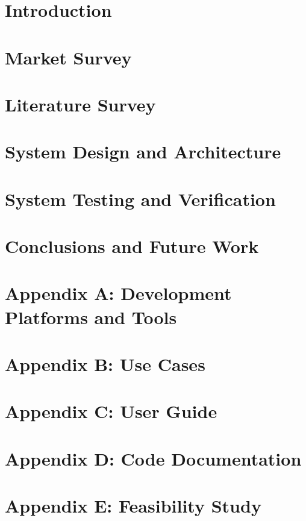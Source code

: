 \documentclass[a4paper,12pt]{report}
\begin{document}
\thispagestyle{empty}

\tableofcontents
\listoffigures
\listoftables
\clearpage


\part{Introduction}




\part{Market Survey}


\part{Literature Survey}


\part{System Design and Architecture}


\part{System Testing and Verification}


\part{Conclusions and Future Work}


%

\part{Appendix A: Development Platforms and Tools}


\part{Appendix B: Use Cases}


\part{Appendix C: User Guide}


\part{Appendix D: Code Documentation}


\part{Appendix E: Feasibility Study}

\end{document}

